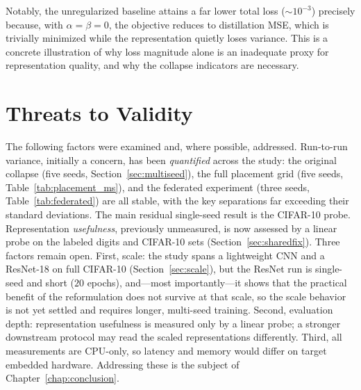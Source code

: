 Notably, the unregularized baseline attains a far lower total loss
($\sim 10^{-3}$) precisely because, with $\alpha = \beta = 0$, the objective
reduces to distillation MSE, which is trivially minimized while the
representation quietly loses variance. This is a concrete illustration of
why loss magnitude alone is an inadequate proxy for representation quality,
and why the collapse indicators are necessary.

\section{Threats to Validity}
\label{sec:threats}
The following factors were examined and, where possible, addressed.
Run-to-run variance, initially a concern, has been \emph{quantified} across
the study: the original collapse (five seeds, Section~\ref{sec:multiseed}), the
full placement grid (five seeds, Table~\ref{tab:placement_ms}), and the
federated experiment (three seeds, Table~\ref{tab:federated}) are all stable,
with the key separations far exceeding their standard deviations. The main
residual single-seed result is the CIFAR-10 probe.
Representation \emph{usefulness}, previously unmeasured, is now assessed by a
linear probe on the labeled digits and CIFAR-10 sets (Section~\ref{sec:sharedfix}).
Three factors remain open. First, scale: the study spans a lightweight CNN and
a ResNet-18 on full CIFAR-10 (Section~\ref{sec:scale}), but the ResNet run is
single-seed and short ($20$ epochs), and---most importantly---it shows that the
practical benefit of the reformulation does not survive at that scale, so the
scale behavior is not yet settled and requires longer, multi-seed training.
Second, evaluation depth: representation usefulness is measured only by a linear
probe; a stronger downstream protocol may read the scaled representations
differently. Third, all measurements are CPU-only, so latency and memory would
differ on target embedded hardware. Addressing these is the subject of
Chapter~\ref{chap:conclusion}.
